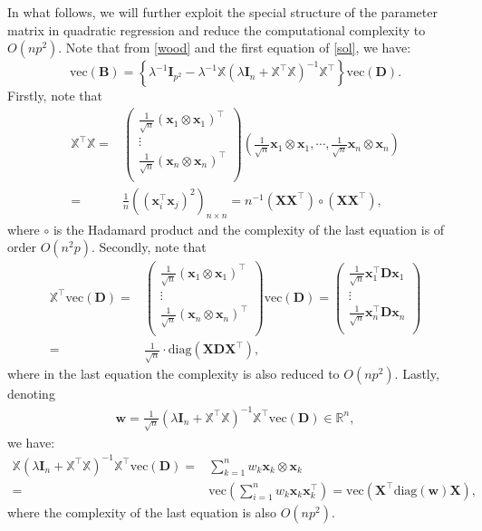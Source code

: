 \documentclass[preprint,authoryear,11pt]{elsarticle}
\def\mR{\mathbb{R}}
\def\diag{\mbox{diag}}
\def\wvec{\mbox{vec}}
\newcommand{\bI}{\mathbf I}
\newcommand{\B}{\mathbf B}
\newcommand{\X}{\mathbf X}
\newcommand{\w}{\mathbf w}
\newcommand{\x}{\mathbf x}
\newcommand{\aD}{\mathbf D}
\newcommand{\cX}{\mathbb {X}}
\newcommand{\trans}{^\top}
\begin{document}
In what follows, we will further exploit the special structure of the parameter matrix in quadratic regression and reduce the computational complexity to $O(np^2)$. Note that from \eqref{wood} and the first equation of \eqref{sol}, we have:
\[
\wvec(\B)= \left\{ 
\lambda ^{-1}\bI_{p^2}-\lambda ^{-1} \cX (\lambda \bI_n+\cX\trans \cX)^{-1} \cX \trans
\right\}  \wvec(\aD).
\]
Firstly,  note that
\begin{align}\label{p1}
	\cX \trans \cX=&\begin{pmatrix}
		\frac{1}{\sqrt{n}} (\x_1 \otimes \x_1)\trans\\
		\vdots\\
		\frac{1}{\sqrt{n}} (\x_n \otimes \x_n)\trans \nonumber\\
	\end{pmatrix}\left(\frac{1}{\sqrt{n}}  \x_1 \otimes \x_1,\cdots,\frac{1}{\sqrt{n}}  \x_n \otimes \x_n\right)\\
	=&\frac{1}{n} \left( (\x_i \trans \x_j)^2  \right)_{n \times n}=n^{-1}  (\X \X \trans )\circ (\X  \X \trans ),
\end{align}
where $\circ$ is the Hadamard  product and the complexity of the last equation is of order $O(n^2p)$. Secondly, note that
\begin{align}\label{p2}
	\cX \trans \wvec(\aD)=&
	\begin{pmatrix}
		\frac{1}{\sqrt{n}} (\x_1 \otimes \x_1)\trans\\
		\vdots\\
		\frac{1}{\sqrt{n}} (\x_n \otimes \x_n)\trans\\
	\end{pmatrix}  \wvec(\aD)
	=
	\begin{pmatrix}
		\frac{1}{\sqrt{n}} \x_1\trans \aD \x_1\\
		\vdots
		\\
		\frac{1}{\sqrt{n}} \x_n\trans \aD \x_n\\
	\end{pmatrix}  \nonumber\\
	=&\frac{1}{\sqrt{n}} \cdot \diag\left(  \X  \aD \X \trans \right),
\end{align}
where in the last equation the complexity is also reduced to $O(np^2)$. Lastly, denoting
\begin{align*}
	\w=\frac{1}{\sqrt{n}}(\lambda \bI_n+\cX\trans \cX)^{-1} \cX \trans  \wvec(\aD) \in \mR^{n},
\end{align*}
we have: 
\begin{align}\label{p3}
	\cX (\lambda \bI_n+\cX\trans \cX)^{-1} \cX \trans  \wvec(\aD)=&\sum_{k=1}^n w_k \x_k \otimes \x_k \nonumber \\
	=&\wvec\left( \sum_{i=1}^n w_k \x_k \x_k \trans \right)=\wvec \left( \X \trans \diag(\w) \X  \right),
\end{align}
where the complexity of the last equation is also  $O(np^2)$. 
\end{document}
